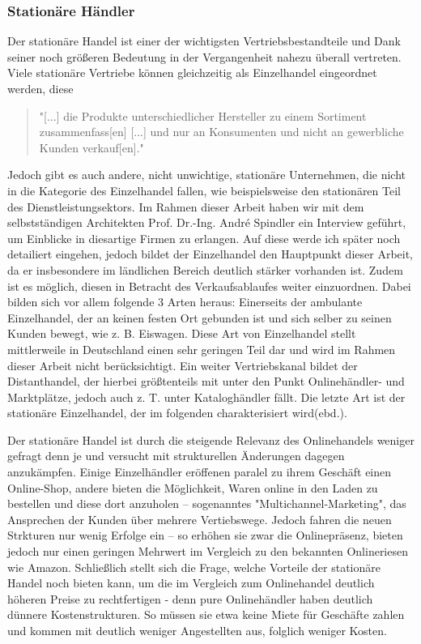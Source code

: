 \begin{folding} \subsubsection{Stationäre Händler}
Der stationäre Handel ist einer der wichtigsten Vertriebsbestandteile und Dank seiner noch größeren Bedeutung in der Vergangenheit nahezu überall vertreten. Viele stationäre Vertriebe können gleichzeitig als Einzelhandel eingeordnet werden, diese
\begin{quote}
    "[...] die Produkte unterschiedlicher Hersteller zu einem Sortiment zusammenfass[en] [...] und nur an Konsumenten und nicht an gewerbliche Kunden verkauf[en]."\cite[S. 20]{Ebert}
\end{quote}
Jedoch gibt es auch andere, nicht unwichtige, stationäre Unternehmen, die nicht in die Kategorie des Einzelhandel fallen, wie beispielsweise den stationären Teil des Dienstleistungsektors. Im Rahmen dieser Arbeit haben wir mit dem selbstständigen Architekten Prof. Dr.-Ing. André Spindler ein Interview geführt, um Einblicke in diesartige Firmen zu erlangen. Auf diese werde ich später noch detailiert eingehen, jedoch bildet der Einzelhandel den Hauptpunkt dieser Arbeit, da er insbesondere im ländlichen Bereich deutlich stärker vorhanden ist. Zudem ist es möglich, diesen in Betracht des Verkaufsablaufes weiter einzuordnen. Dabei bilden sich vor allem folgende 3 Arten heraus: Einerseits der ambulante Einzelhandel, der an keinen festen Ort gebunden ist und sich selber zu seinen Kunden bewegt, wie z. B. Eiswagen. Diese Art von Einzelhandel stellt mittlerweile in Deutschland einen sehr geringen Teil dar und wird im Rahmen dieser Arbeit nicht berücksichtigt. Ein weiter Vertriebskanal bildet der Distanthandel, der hierbei größtenteils mit unter den Punkt Onlinehändler- und Marktplätze, jedoch auch z. T. unter Kataloghändler fällt. Die letzte Art ist der stationäre Einzelhandel, der im folgenden charakterisiert wird(ebd.).

Der stationäre Handel ist durch die steigende Relevanz des Onlinehandels weniger gefragt denn je und versucht mit strukturellen Änderungen dagegen anzukämpfen. Einige Einzelhändler eröffenen paralel zu ihrem Geschäft einen Online-Shop, andere bieten die Möglichkeit, Waren online in den Laden zu bestellen und diese dort anzuholen – sogenanntes "Multichannel-Marketing", das Ansprechen der Kunden über mehrere Vertiebswege\cite[S. 34f]{Graf}. Jedoch fahren die neuen Strkturen nur wenig Erfolge ein – so erhöhen sie zwar die Onlinepräsenz, bieten jedoch nur einen geringen Mehrwert im Vergleich zu den bekannten Onlineriesen wie Amazon\cite[S. 34f]{Graf}. 
Schließlich stellt sich die Frage, welche Vorteile der stationäre Handel noch bieten kann, um die im Vergleich zum Onlinehandel deutlich höheren Preise zu rechtfertigen - denn pure Onlinehändler haben deutlich dünnere Kostenstrukturen\cite[S. 14]{evilcom}. So müssen sie etwa keine Miete für Geschäfte zahlen und kommen mit deutlich weniger Angestellten aus, folglich weniger Kosten.


\end{folding}
